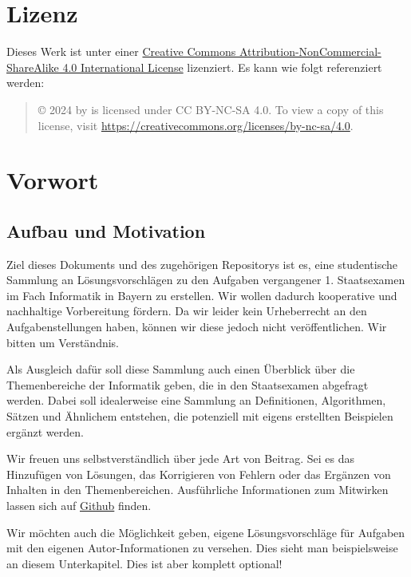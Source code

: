 \maketitle
\chapter*{Lizenz}
Dieses Werk ist unter einer
\href{https://creativecommons.org/licenses/by-nc-sa/4.0/}{Creative Commons
Attribution-NonCommercial-ShareAlike 4.0 International License} lizenziert. Es
kann wie folgt referenziert werden:
\begin{quote}
	\doctitle
	\copyright{} 2024 by \docauthor is licensed under CC BY-NC-SA 4.0.
	To view a copy of this license, visit \url{https://creativecommons.org/licenses/by-nc-sa/4.0}.
\end{quote}

\tableofcontents

\chapter{Vorwort}
\section{Aufbau und Motivation}
Ziel dieses Dokuments und des zugehörigen Repositorys ist es, eine studentische
Sammlung an Lösungsvorschlägen zu den Aufgaben vergangener 1. Staatsexamen im
Fach Informatik in Bayern zu erstellen. Wir wollen dadurch kooperative und
nachhaltige Vorbereitung fördern. Da wir leider kein Urheberrecht an den
Aufgabenstellungen haben, können wir diese jedoch nicht veröffentlichen. Wir
bitten um Verständnis.

Als Ausgleich dafür soll diese Sammlung auch einen Überblick über die
Themenbereiche der Informatik geben, die in den Staatsexamen abgefragt werden.
Dabei soll idealerweise eine Sammlung an Definitionen, Algorithmen, Sätzen und
Ähnlichem entstehen, die potenziell mit eigens erstellten Beispielen ergänzt
werden.

Wir freuen uns selbstverständlich über jede Art von Beitrag. Sei es das Hinzufügen von Lösungen,
das Korrigieren von Fehlern oder das Ergänzen von Inhalten in den
Themenbereichen. Ausführliche Informationen zum Mitwirken lassen sich auf
\href{https://github.com/fsi-la-inf/stex-stuff/.github/CONTRIBUTING.md}{Github} finden.

Wir möchten auch die Möglichkeit geben, eigene Lösungsvorschläge für
Aufgaben mit den eigenen Autor-Informationen zu versehen. Dies sieht man
beispielsweise an diesem Unterkapitel. Dies ist aber komplett optional!

